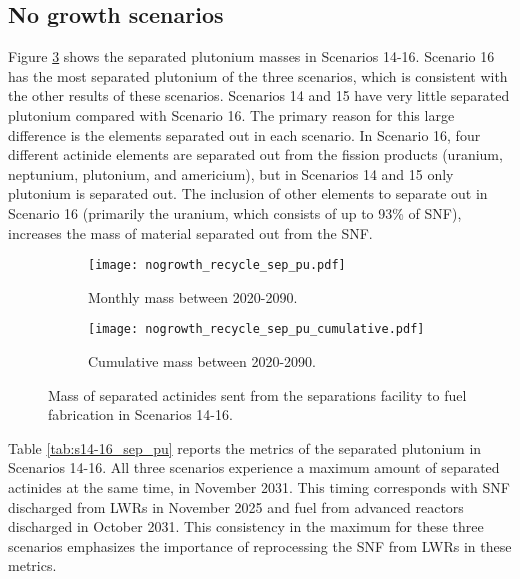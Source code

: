 \subsection{No growth scenarios}
Figure \ref{fig:nogrowth_recycle_sep_pu} shows the separated plutonium 
masses in Scenarios 14-16. Scenario 16 has the most separated 
plutonium of the three scenarios, which is consistent with the other 
results of these scenarios. Scenarios 14 and 15 have very little 
separated plutonium compared with Scenario 16. The primary reason 
for this large difference is the elements separated out in 
each scenario. In Scenario 16, four different actinide elements 
are separated out from the fission products (uranium, neptunium,
plutonium, and americium), but in Scenarios 14 and 15 only plutonium 
is separated out. The inclusion of other elements to separate out 
in Scenario 16 (primarily the uranium, which consists of up to 
93\% of \gls{SNF}), increases the mass of material  
separated out from the \gls{SNF}. 

\begin{figure}[h!]
    \centering
    \begin{subfigure}[b]{0.49\textwidth}
        \centering
        \texttt{[image: nogrowth\_recycle\_sep\_pu.pdf]}
        \caption{Monthly mass between 2020-2090.}
        \label{fig:nogrowth_recycle_sep_pu_all}
    \end{subfigure}
    \hfill
    \begin{subfigure}[b]{0.49\textwidth}
        \centering
        \texttt{[image: nogrowth\_recycle\_sep\_pu\_cumulative.pdf]}
        \caption{Cumulative mass between 2020-2090.}
        \label{fig:nogrowth_recycle_sep_pu_cumulative}
    \end{subfigure}
       \caption{Mass of separated actinides sent from the 
       separations facility to fuel fabrication in Scenarios 14-16.}
       \label{fig:nogrowth_recycle_sep_pu}
\end{figure}

Table \ref{tab:s14-16_sep_pu} reports the metrics of the separated 
plutonium in Scenarios 14-16. All three scenarios experience a 
maximum amount of separated actinides at the same time, in 
November 2031. This timing corresponds with \gls{SNF} discharged 
from \glspl{LWR} in November 2025 and fuel from advanced reactors
discharged in October 2031. This consistency in the maximum 
for these three scenarios emphasizes the importance of reprocessing 
the \gls{SNF} from \glspl{LWR} in these metrics.  

